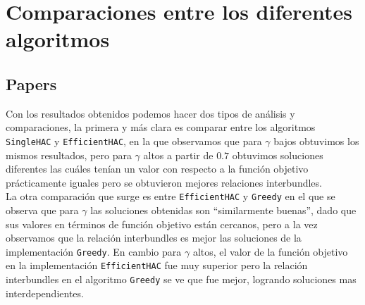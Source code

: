 \section{Comparaciones entre los diferentes algoritmos}\label{conc:compDifAlgo}
\subsection{Papers}
Con los resultados obtenidos podemos hacer dos tipos de análisis y comparaciones, la primera y más 
clara es comparar entre los algoritmos \texttt{SingleHAC} y \texttt{EfficientHAC}, en la que 
observamos que para $\gamma$ bajos obtuvimos los mismos resultados, pero para $\gamma$ altos a 
partir de $0.7$ obtuvimos soluciones diferentes las cuáles tenían un valor con respecto a la 
función objetivo prácticamente iguales pero se obtuvieron mejores relaciones interbundles.\\
La otra comparación que surge es entre \texttt{EfficientHAC} y \texttt{Greedy} en el que se observa 
que para $\gamma$ las soluciones obtenidas son \textquotedblleft similarmente 
buenas\textquotedblright , dado que sus valores en términos de función objetivo están cercanos, 
pero a la vez observamos que la relación interbundles es mejor las soluciones de la implementación 
\texttt{Greedy}. En cambio para $\gamma$ altos, el valor de la función objetivo en la 
implementación \texttt{EfficientHAC} fue muy superior pero la relación interbundles en el algoritmo 
\texttt{Greedy} se ve que fue mejor, logrando soluciones mas interdependientes.

